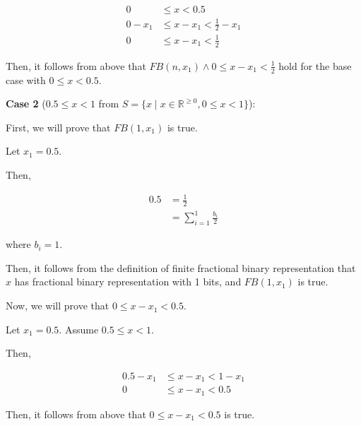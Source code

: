 \documentclass[12pt]{article}
\begin{document}
\begin{enumerate}[a.]
    \begin{align}
        0 &\leq x < 0.5\\
        0 - x_1 &\leq x - x_1 < \frac{1}{2} - x_1\\
        0 &\leq x - x_1 < \frac{1}{2}
    \end{align}

    \bigskip

    Then, it follows from above that $FB(n,x_1) \land 0 \leq x - x_1 < \frac{1}{2}$
    hold for the base case with $0 \leq x < 0.5$.

    \bigskip

    \textbf{Case 2} ($0.5 \leq x < 1$ from $S = \{x \mid x \in \mathbb{R}^{\geq 0}, 0 \leq x < 1\}$):

    \bigskip

    First, we will prove that $FB(1,x_1)$ is true.

    \bigskip

    Let $x_1 = 0.5$.

    \bigskip

    Then,

    \begin{align}
        0.5 &= \frac{1}{2}\\
        &= \sum\limits_{i=1}^1 \frac{b_i}{2}
    \end{align}

    where $b_i = 1$.

    \bigskip

    Then, it follows from the definition of finite fractional binary representation
    that $x$ has fractional binary representation with 1 bits, and $FB(1,x_1)$ is
    true.

    \bigskip

    Now, we will prove that $0 \leq x - x_1 < 0.5$.

    \bigskip

    Let $x_1 = 0.5$. Assume $0.5 \leq x < 1$.

    \bigskip

    Then,

    \begin{align}
        0.5 - x_1 &\leq x - x_1 < 1 - x_1\\
        0 &\leq x - x_1 < 0.5
    \end{align}

    \bigskip

    Then, it follows from above that $ 0 \leq x - x_1 < 0.5$ is true.

    \bigskip


\end{enumerate}
\end{document}
